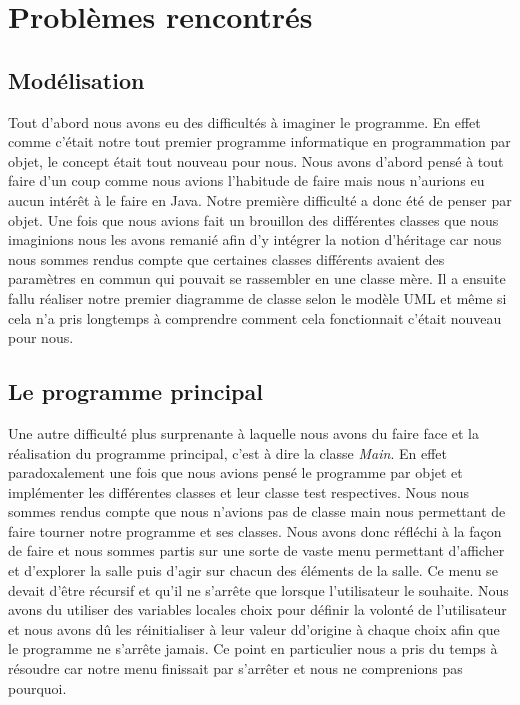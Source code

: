 \documentclass[12,french]{report}
\begin{document}
\chapter{Problèmes rencontrés}

\section{Modélisation}

Tout d'abord nous avons eu des difficultés à imaginer le programme. En effet comme c'était notre tout premier programme informatique en programmation par objet, le concept était tout nouveau pour nous. Nous avons d'abord pensé à tout faire d'un coup comme nous avions l'habitude de faire mais nous n'aurions eu aucun intérêt à le faire en Java. Notre première difficulté a donc été de penser par objet. Une fois que nous avions fait un brouillon des différentes classes que nous imaginions nous les avons remanié afin d'y intégrer la notion d'héritage car nous nous sommes rendus compte que certaines classes différents avaient des paramètres en commun qui pouvait se rassembler en une classe mère. Il a ensuite fallu réaliser notre premier diagramme de classe selon le modèle UML et même si cela n'a pris longtemps à comprendre comment cela fonctionnait c'était nouveau pour nous.

\section{Le programme principal}

Une autre difficulté plus surprenante à laquelle nous avons du faire face et la réalisation du programme principal, c'est à  dire la classe \textit{Main}. En effet paradoxalement une fois que nous avions pensé le programme par objet et implémenter les différentes classes et leur classe test respectives. Nous nous sommes rendus compte que nous n'avions pas de classe main nous permettant de faire tourner notre programme et ses classes. Nous avons donc réfléchi à la façon de faire et nous sommes partis sur une sorte de vaste menu permettant d'afficher et d'explorer la salle puis d'agir sur chacun des éléments de la salle. Ce menu se devait d'être récursif et qu'il ne s'arrête que lorsque l'utilisateur le souhaite. Nous avons du utiliser des variables locales choix pour définir la volonté de l'utilisateur et nous avons dû les réinitialiser à leur valeur dd'origine à chaque choix afin que le programme ne s'arrête jamais. Ce point en particulier nous a pris du temps à résoudre car notre menu finissait par s'arrêter et nous ne comprenions pas pourquoi.
 
\end{document}
